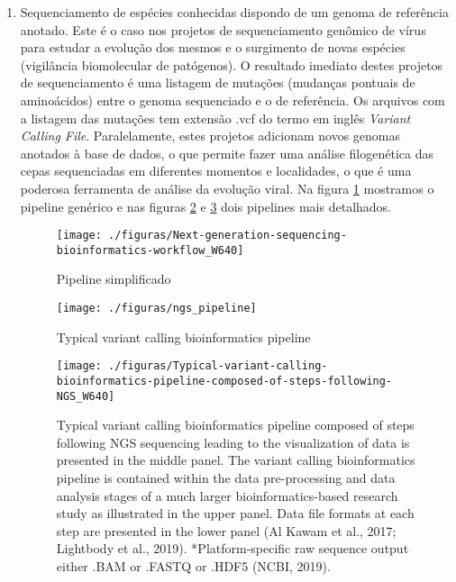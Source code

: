 \documentclass[12pt]{article}
\begin{document}
\begin{itemize}
\begin{enumerate}
        \item Sequenciamento de espécies conhecidas dispondo de um genoma de referência anotado. Este é o caso nos projetos de sequenciamento genômico de vírus para estudar a evolução dos mesmos e o surgimento de novas espécies (vigilância biomolecular de patógenos). O resultado imediato destes projetos de sequenciamento é uma listagem de mutações (mudanças pontuais de aminoácidos) entre o genoma sequenciado e o de referência. Os arquivos com a listagem das mutações tem extensão .vcf do termo em inglês {\it{Variant Calling File}}. Paralelamente, estes projetos adicionam novos genomas anotados à base de dados, o que permite fazer uma análise filogenética das cepas sequenciadas em diferentes momentos e localidades, o que é uma poderosa ferramenta de análise da evolução viral. 
        Na figura \ref{fig:pipeline_1} mostramos o pipeline genérico e nas figuras \ref{fig:pipeline_2} e \ref{fig:pipeline_3} dois pipelines mais detalhados.
        \begin{figure}[h!]
            \centering
            \texttt{[image: ./figuras/Next-generation-sequencing-bioinformatics-workflow\_W640]}
            \caption{Pipeline simplificado}
            \label{fig:pipeline_1}
        \end{figure}
        
        \begin{figure}[h!]
            \centering
            \texttt{[image: ./figuras/ngs\_pipeline]}
            \caption{Typical variant calling bioinformatics pipeline}
            \label{fig:pipeline_2}
        \end{figure}
        
         \begin{figure}[h!]
            \centering
            \texttt{[image: ./figuras/Typical-variant-calling-bioinformatics-pipeline-composed-of-steps-following-NGS\_W640]}
            \caption{Typical variant calling bioinformatics pipeline composed of steps following NGS sequencing leading to the visualization of data is presented in the middle panel. The variant calling bioinformatics pipeline is contained within the data pre-processing and data analysis stages of a much larger bioinformatics-based research study as illustrated in the upper panel. Data file formats at each step are presented in the lower panel (Al Kawam et al., 2017; Lightbody et al., 2019). *Platform-specific raw sequence output either .BAM or .FASTQ or .HDF5 (NCBI, 2019).}
            \label{fig:pipeline_3}
        \end{figure}
        

\end{enumerate}
\end{itemize}
\end{document}
